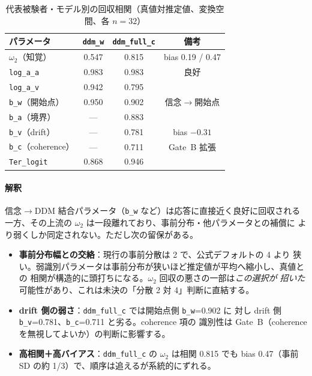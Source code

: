 \documentclass[11pt]{ltjsarticle}
\newcommand{\code}[1]{\texttt{#1}}
\begin{document}
\begin{table}[htbp]
\centering
\caption{代表被験者・モデル別の回収相関（真値対推定値、変換空間、各 \(n=32\)）}
\label{tab:recovery}
\begin{tabular}{lccc}
\toprule
パラメータ & \code{ddm\_w} & \code{ddm\_full\_c} & 備考 \\
\midrule
\(\omega_2\)（知覚）  & 0.547 & 0.815 & bias 0.19 / 0.47 \\
\code{log\_a\_a}      & 0.983 & 0.983 & 良好 \\
\code{log\_a\_v}      & 0.942 & 0.795 & \\
\code{b\_w}（開始点） & 0.950 & 0.902 & 信念\(\to\)開始点 \\
\code{b\_a}（境界）   & ---   & 0.883 & \\
\code{b\_v}（drift）  & ---   & 0.781 & bias \(-0.31\) \\
\code{b\_c}（coherence） & --- & 0.711 & Gate~B 拡張 \\
\code{Ter\_logit}     & 0.868 & 0.946 & \\
\bottomrule
\end{tabular}
\end{table}

\paragraph{解釈}
信念\(\to\)DDM 結合パラメータ（\code{b\_w} など）は応答に直接近く良好に回収される
一方、その上流の \(\omega_2\) は一段離れており、事前分布・他パラメータとの補償に
より弱くしか同定されない。ただし次の留保がある。
\begin{itemize}[leftmargin=1.4em]
  \item \textbf{事前分布幅との交絡}：現行の事前分散は 2 で、公式デフォルトの 4 より
        狭い。弱識別パラメータは事前分布が狭いほど推定値が平均へ縮小し、真値との
        相関が構造的に頭打ちになる。\(\omega_2\) 回収の悪さの一部は\emph{この選択が
        招いた}可能性があり、これは未決の「分散 2 対 4」判断に直結する。
  \item \textbf{drift 側の弱さ}：\code{ddm\_full\_c} では開始点側 \code{b\_w}=0.902 に
        対し drift 側 \code{b\_v}=0.781、\code{b\_c}=0.711 と劣る。coherence 項の
        識別性は Gate~B（coherence を無視してよいか）の判断に影響する。
  \item \textbf{高相関＋高バイアス}：\code{ddm\_full\_c} の \(\omega_2\) は相関 0.815
        でも bias 0.47（事前 SD の約 1/3）で、順序は追えるが系統的にずれる。
\end{itemize}
\end{document}
